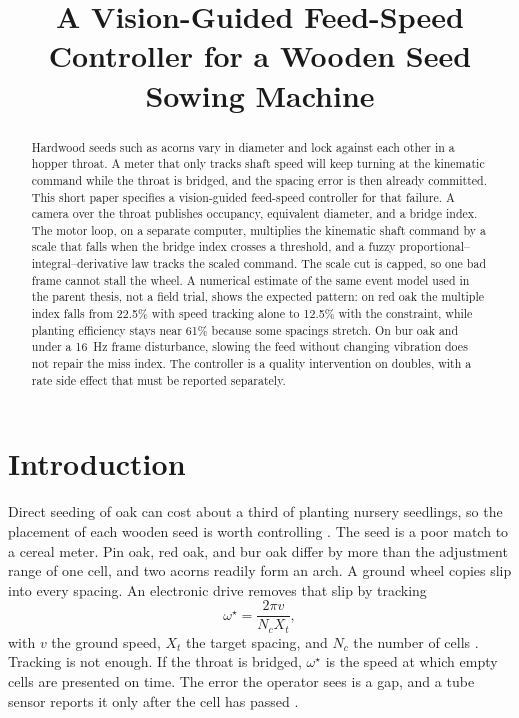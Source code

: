 \documentclass[11pt,a4paper]{article}
\title{A Vision-Guided Feed-Speed Controller for a Wooden Seed Sowing Machine}
\author{}
\date{}
\begin{document}
\maketitle
\thispagestyle{empty}

\begin{abstract}
\noindent
Hardwood seeds such as acorns vary in diameter and lock against each other in a hopper throat. A meter that only tracks shaft speed will keep turning at the kinematic command while the throat is bridged, and the spacing error is then already committed. This short paper specifies a vision-guided feed-speed controller for that failure. A camera over the throat publishes occupancy, equivalent diameter, and a bridge index. The motor loop, on a separate computer, multiplies the kinematic shaft command by a scale that falls when the bridge index crosses a threshold, and a fuzzy proportional--integral--derivative law tracks the scaled command. The scale cut is capped, so one bad frame cannot stall the wheel. A numerical estimate of the same event model used in the parent thesis, not a field trial, shows the expected pattern: on red oak the multiple index falls from 22.5\% with speed tracking alone to 12.5\% with the constraint, while planting efficiency stays near 61\% because some spacings stretch. On bur oak and under a 16~Hz frame disturbance, slowing the feed without changing vibration does not repair the miss index. The controller is a quality intervention on doubles, with a rate side effect that must be reported separately.
\end{abstract}

\section{Introduction}

Direct seeding of oak can cost about a third of planting nursery seedlings, so the placement of each wooden seed is worth controlling \cite{lof2019}. The seed is a poor match to a cereal meter. Pin oak, red oak, and bur oak differ by more than the adjustment range of one cell, and two acorns readily form an arch. A ground wheel copies slip into every spacing. An electronic drive removes that slip by tracking
\begin{equation}
\omega^{\star} = \frac{2\pi v}{N_c X_t},
\label{eq:w}
\end{equation}
with $v$ the ground speed, $X_t$ the target spacing, and $N_c$ the number of cells \cite{he2017,zhao2024}. Tracking is not enough. If the throat is bridged, $\omega^{\star}$ is the speed at which empty cells are presented on time. The error the operator sees is a gap, and a tube sensor reports it only after the cell has passed \cite{kocher1998}.
\end{document}
